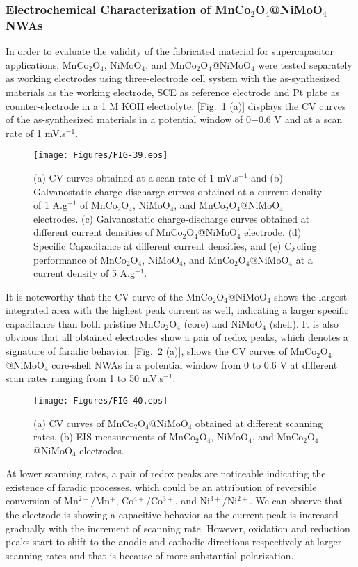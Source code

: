 \documentclass[reprint,amsmath,amssymb,aps,floatfix,
]{revtex4-2}
\begin{document}
\subsubsection{Electrochemical Characterization of MnCo$_2$O$_4$@NiMoO$_4$ NWAs}
In order to evaluate the validity of the fabricated material for supercapacitor applications, MnCo$_2$O$_4$, NiMoO$_4$, and MnCo$_2$O$_4$@NiMoO$_4$ were tested separately as working electrodes using three-electrode cell system with the as-synthesized materials as the working electrode, SCE as reference electrode and Pt plate as counter-electrode in a 1 M KOH electrolyte. [Fig.~\ref{fig:fig39} (a)] displays the CV curves of the as-synthesized materials in a potential window of 0$-$0.6 V and at a scan rate of 1 mV.s$^{-1}$.
\begin{figure}[b]
    \centering
    \texttt{[image: Figures/FIG-39.eps]}
    \caption{\label{fig:fig39}(a) CV curves obtained at a scan rate of 1 mV.s$^{-1}$ and (b) Galvanostatic charge-discharge curves obtained at a current density of 1 A.g$^{-1}$ of MnCo$_2$O$_4$, NiMoO$_4$, and MnCo$_2$O$_4$@NiMoO$_4$ electrodes. (c) Galvanostatic charge-discharge curves obtained at different current densities of MnCo$_2$O$_4$@NiMoO$_4$ electrode. (d) Specific Capacitance at different current densities, and (e) Cycling performance of MnCo$_2$O$_4$, NiMoO$_4$, and MnCo$_2$O$_4$@NiMoO$_4$ at a current density of 5 A.g$^{-1}$.}
    \end{figure}
It is noteworthy that the CV curve of the MnCo$_2$O$_4$@NiMoO$_4$ shows the largest integrated area with the highest peak current as well, indicating a larger specific capacitance than both pristine MnCo$_2$O$_4$ (core) and NiMoO$_4$ (shell). It is also obvious that all obtained electrodes show a pair of redox peaks, which denotes a signature of faradic behavior. [Fig.~\ref{fig:fig40} (a)], shows the CV curves of MnCo$_2$O$_4$@NiMoO$_4$ core-shell NWAs in a potential window from 0 to 0.6 V at different scan rates ranging from 1 to 50 mV.s$^{-1}$.
\begin{figure}[t]
    \centering
    \texttt{[image: Figures/FIG-40.eps]}
    \caption{\label{fig:fig40}(a) CV curves of MnCo$_2$O$_4$@NiMoO$_4$ obtained at different scanning rates, (b) EIS measurements of MnCo$_2$O$_4$, NiMoO$_4$, and MnCo$_2$O$_4$@NiMoO$_4$ electrodes.}
    \end{figure}
At lower scanning rates, a pair of redox peaks are noticeable indicating the existence of faradic processes, which could be an attribution of reversible conversion of Mn$^{2+}$/Mn$^+$, Co$^{4+}$/Co$^{3+}$, and Ni$^{3+}$/Ni$^{2+}$.\cite{Cai2014} We can observe that the electrode is showing a capacitive behavior as the current peak is increased gradually with the increment of scanning rate. However, oxidation and reduction peaks start to shift to the anodic and cathodic directions respectively at larger scanning rates and that is because of more substantial polarization.\cite{Mai2017}
\end{document}
